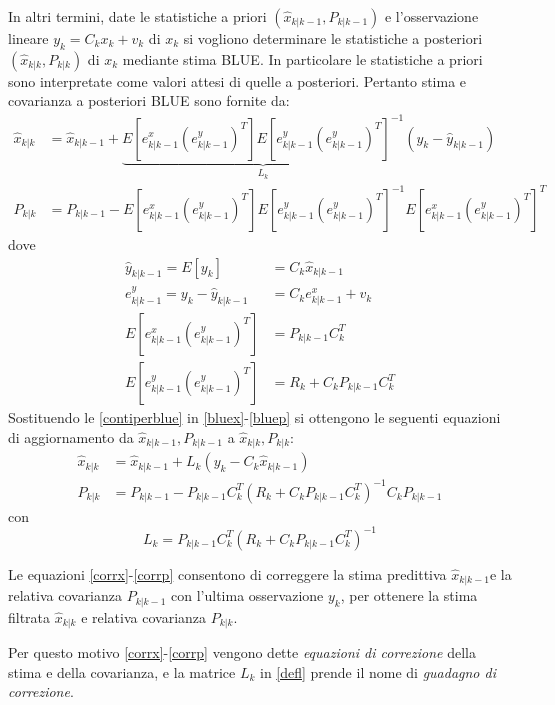 In altri termini, date le statistiche a priori $(\hat{x}_{k|k-1},P_{k|k-1})$ e l’osservazione lineare $y_k=C_kx_k+v_k$ di $x_k$ si vogliono determinare le statistiche a posteriori $(\hat{x}_{k|k},P_{k|k})$ di $x_k$ mediante stima BLUE. In particolare le statistiche a priori sono interpretate come valori attesi di quelle a posteriori. Pertanto stima e covarianza a posteriori BLUE sono fornite da:
\begin{align}
\label{bluex}
\hat{x}_{k|k}&=\hat{x}_{k|k-1}+\underbrace{E[e^x_{k|k-1}(e^y_{k|k-1})^T]E[e^y_{k|k-1}(e^y_{k|k-1})^T]^{-1}}_{L_k}(y_k-\hat{y}_{k|k-1})\\
\label{bluep}
P_{k|k}&=P_{k|k-1}-E[e^x_{k|k-1}(e^y_{k|k-1})^T]E[e^y_{k|k-1}(e^y_{k|k-1})^T]^{-1}E[e^x_{k|k-1}(e^y_{k|k-1})^T]^T
\end{align}
dove
\begin{equation}
\label{contiperblue}
\begin{split}
\hat{y}_{k|k-1} = E[y_k] &=C_k\hat{x}_{k|k-1}\\
e^y_{k|k-1} = y_k-\hat{y}_{k|k-1} &=C_ke^x_{k|k-1}+v_k\\
E[e^x_{k|k-1}(e^y_{k|k-1})^T] &=P_{k|k-1}C_k^T\\
E[e^y_{k|k-1}(e^y_{k|k-1})^T] &=R_k+C_kP_{k|k-1}C_k^T
\end{split}
\end{equation}
Sostituendo le \eqref{contiperblue} in \eqref{bluex}-\eqref{bluep} si ottengono le seguenti equazioni di aggiornamento da $\hat{x}_{k|k-1},P_{k|k-1}$ a $\hat{x}_{k|k},P_{k|k}$:
\begin{align}
\label{corrx}
\hat{x}_{k|k}&=\hat{x}_{k|k-1}+L_k(y_k-C_k\hat{x}_{k|k-1})\\
\label{corrp}
P_{k|k}&=P_{k|k-1}-P_{k|k-1}C_k^T(R_k+C_kP_{k|k-1}C_k^T)^{-1}C_kP_{k|k-1}
\end{align}
con
\begin{equation}
\label{defl}
L_k=P_{k|k-1}C_k^T(R_k+C_kP_{k|k-1}C_k^T)^{-1}
\end{equation}

Le equazioni \eqref{corrx}-\eqref{corrp} consentono di correggere la stima predittiva $\hat{x}_{k|k-1} $e la relativa covarianza $P_{k|k-1} $ con l’ultima osservazione $y_k $, per ottenere la stima filtrata $\hat{x}_{k|k} $ e relativa covarianza $P_{k|k} $.

Per questo motivo \eqref{corrx}-\eqref{corrp} vengono dette \textit{equazioni di correzione} della stima e della covarianza, e la matrice $L_k$ in \eqref{defl} prende il nome di \textit{guadagno di correzione}.

